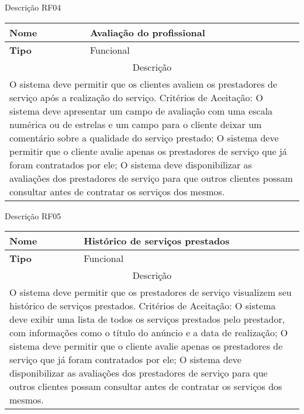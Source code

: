 \begin{quadro}[htb]
	\centering
	\caption{\label{Formatação do texto.}Descrição RF04}	
	\begin{tabular}{|l|p{11cm}|}
		\hline
		\textbf{Nome}    & Avaliação do profissional\\ \hline
		\textbf{Tipo}    & Funcional\\ \hline
		\multicolumn{2}{|c|}{Descrição}\\ \hline
		\multicolumn{2}{|p{12cm}|}{
			O sistema deve permitir que os clientes avaliem os prestadores de serviço após a realização do serviço. \newline
			\newline Critérios de Aceitação: \newline
			O sistema deve apresentar um campo de avaliação com uma escala numérica ou de estrelas e um campo para o cliente deixar um comentário sobre a qualidade do serviço prestado; \newline
			\newline O sistema deve permitir que o cliente avalie apenas os prestadores de serviço que já foram contratados por ele; \newline
			\newline O sistema deve disponibilizar as avaliações dos prestadores de serviço para que outros clientes possam consultar antes de contratar os serviços dos mesmos.
			} \\ \hline
	\end{tabular}
\end{quadro}

\begin{quadro}[htb]
	\centering
	\caption{\label{Formatação do texto.}Descrição RF05}	
	\begin{tabular}{|l|p{11cm}|}
		\hline
		\textbf{Nome}    & Histórico de serviços prestados\\ \hline
		\textbf{Tipo}    & Funcional\\ \hline
		\multicolumn{2}{|c|}{Descrição}\\ \hline
		\multicolumn{2}{|p{12cm}|}{
			O sistema deve permitir que os prestadores de serviço visualizem seu histórico de serviços prestados. \newline
			\newline Critérios de Aceitação: \newline
			O sistema deve exibir uma lista de todos os serviços prestados pelo prestador, com informações como o título do anúncio e a data de realização; \newline
			\newline O sistema deve permitir que o cliente avalie apenas os prestadores de serviço que já foram contratados por ele; \newline
			\newline O sistema deve disponibilizar as avaliações dos prestadores de serviço para que outros clientes possam consultar antes de contratar os serviços dos mesmos.
			} \\ \hline
	\end{tabular}
\end{quadro}

